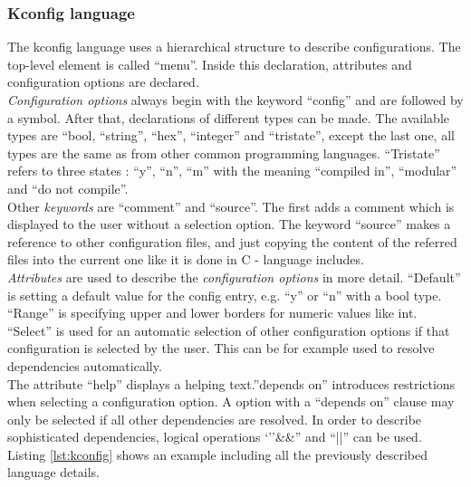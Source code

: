 \documentclass{sig-alternate-05-2015}
\begin{document}
\subsubsection{Kconfig language}
The kconfig language uses a hierarchical structure to describe configurations. The top-level element is called ``menu''. Inside this declaration, attributes and configuration options are declared. \\
\emph{Configuration options} always begin with the keyword ``config'' and are followed by a symbol. After that, declarations of different types can be made. The available types are ``bool, ``string'', ``hex'', ``integer'' and ``tristate'', except the last one, all types are the same as from other  common programming languages. ``Tristate'' refers to three states : ``y'', ``n'', ``m'' with the meaning ``compiled in'', ``modular'' and ``do not compile''.\\
Other \emph{keywords} are ``comment'' and ``source''. The first adds a comment which is displayed to the user without a selection option. The keyword ``source'' makes a reference to other configuration files, and just copying the content of the referred files into the current one like it is done in C - language  includes.\\
\emph{Attributes} are used to describe the \emph{configuration options} in more detail. ``Default'' is setting a default value for the config entry, e.g. ``y'' or ``n'' with a bool type. ``Range'' is specifying  upper and lower borders for numeric values like int. ``Select'' is used for an automatic selection of other configuration options if that configuration is selected by the user. This can be for example used to resolve dependencies automatically.\\
The attribute ``help'' displays a helping text.''depends on'' introduces restrictions when selecting a configuration option. A option with a ``depends on'' clause may only be selected if all other dependencies are resolved. In order to describe sophisticated dependencies, logical operations `''\&\&'' and ``||'' can be used. Listing \ref{lst:kconfig} shows an example including all the previously described language details.

\end{document}
